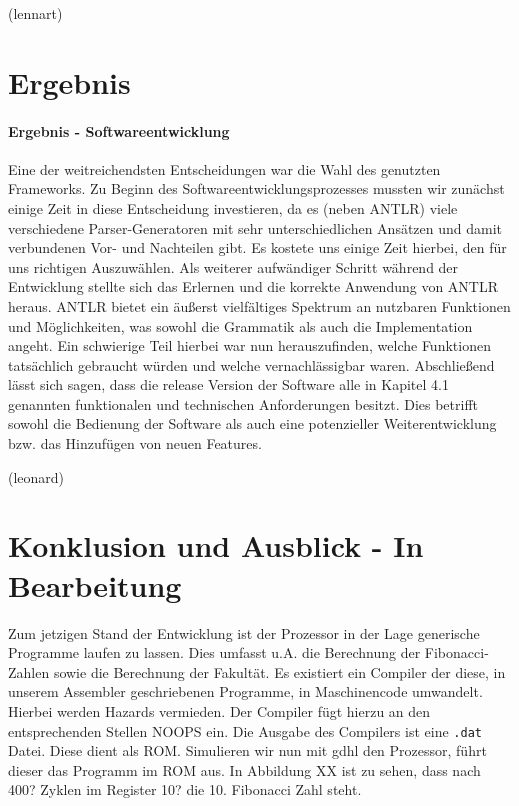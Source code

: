 \documentclass[paper=a4,fontsize=12pt,twocolumn]{scrreprt}
\begin{document}
(lennart)

\chapter{Ergebnis}

\subsubsection{Ergebnis - Softwareentwicklung}
Eine der weitreichendsten Entscheidungen war die Wahl des genutzten Frameworks.
Zu Beginn des Softwareentwicklungsprozesses mussten wir zunächst einige Zeit in diese Entscheidung investieren, da es (neben ANTLR) viele verschiedene Parser-Generatoren mit sehr unterschiedlichen Ansätzen und damit verbundenen Vor- und Nachteilen gibt.
Es kostete uns einige Zeit hierbei, den für uns richtigen Auszuwählen.
Als weiterer aufwändiger Schritt während der Entwicklung stellte sich das Erlernen und die korrekte Anwendung von ANTLR heraus.
ANTLR bietet ein äußerst vielfältiges Spektrum an nutzbaren Funktionen und Möglichkeiten, was sowohl die Grammatik als auch die Implementation angeht.
Ein schwierige Teil hierbei war nun herauszufinden, welche Funktionen tatsächlich gebraucht würden und welche vernachlässigbar waren.
Abschließend lässt sich sagen, dass die release Version der Software alle in Kapitel 4.1
genannten funktionalen und technischen Anforderungen besitzt.
Dies betrifft sowohl die Bedienung  der Software als auch eine potenzieller Weiterentwicklung bzw. das Hinzufügen von neuen Features.


(leonard)

\chapter{Konklusion und Ausblick - In Bearbeitung}
Zum jetzigen Stand der Entwicklung ist der Prozessor in der Lage generische Programme laufen zu lassen.
Dies umfasst u.A. die Berechnung der Fibonacci-Zahlen sowie die Berechnung der Fakultät.
Es existiert ein Compiler der diese, in unserem Assembler geschriebenen Programme, in Maschinencode umwandelt.
Hierbei werden Hazards vermieden.
Der Compiler fügt hierzu an den entsprechenden Stellen NOOPS ein.
Die Ausgabe des Compilers ist eine \texttt{.dat} Datei.
Diese dient als ROM.
Simulieren wir nun mit gdhl den Prozessor, führt dieser das Programm im ROM aus.
In Abbildung XX ist zu sehen, dass nach 400? Zyklen im Register 10? die 10. Fibonacci Zahl steht.
\end{document}
